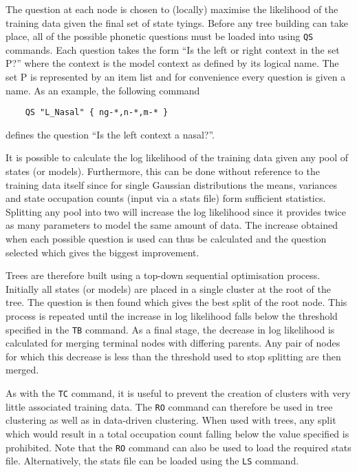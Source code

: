 The question at each node is chosen to (locally) maximise the likelihood
of the training data given the final set of state tyings. 
Before any tree building can take place, all of the possible phonetic
questions must be loaded into  using \texttt{QS} 
commands.  Each
question takes the form ``Is the left or right context in the set P?'' where the
context is the model context as defined by its logical name.  The 
set P is
represented by an item list and
for convenience every question is given a name.  As an example, the
following command 
\begin{verbatim}
    QS "L_Nasal" { ng-*,n-*,m-* }
\end{verbatim}
defines the question ``Is the left context a nasal?''.

It is possible to calculate the log likelihood of the training
data given any pool of states (or models).  Furthermore, this 
can be done without reference to the
training data itself since for single Gaussian distributions the means, variances
and state occupation counts (input via a stats file) form sufficient statistics.
Splitting any pool into two will increase the log likelihood since it provides twice
as many parameters to model the same amount of data.  The increase obtained when
each possible question is used can thus be calculated and the question selected
which gives the biggest improvement.  

Trees are therefore built using a top-down sequential optimisation process.
Initially all states (or models) are placed in a single cluster at the root
of the tree.  The question is then found which gives the best split of the root
node.  This process is repeated until the increase in log likelihood falls
below the threshold specified in the \texttt{TB} command.
As a final stage, the decrease in log likelihood is calculated for merging
terminal nodes with differing parents.  Any pair of nodes for which this
decrease is less than the threshold used to stop splitting are then merged.

As with the \texttt{TC} command, it is useful to prevent the creation of
clusters with very little associated training data.  The \texttt{RO} command
can therefore be used in tree clustering as well as in data-driven clustering.
When used with trees, any split which would result in a total occupation count
falling below the value specified is prohibited.  Note that the \texttt{RO}
command can also be used to load the required stats file.  Alternatively,
the stats file can be loaded using the \texttt{LS} command.

